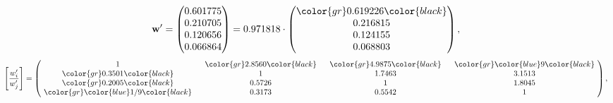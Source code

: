 \begin{example}
\begin{equation*}
\mathbf{w}^{\prime} =
\begin{pmatrix}
0.601775\\
0.210705\\
0.120656\\
0.066864
\end{pmatrix} =
0.971818\cdot
\begin{pmatrix}
\color{gr} 0.619226\color{black} \\
0.216815\\
0.124155\\
0.068803
\end{pmatrix},
\end{equation*}
\begin{equation*}
\left[ \frac{{w}^{\prime}_i}{{w}^{\prime}_j} \right] =
\begin{pmatrix}
$\,\,$ 1 $\,\,$ & $\,\,$\color{gr} 2.8560\color{black} $\,\,$ & $\,\,$\color{gr} 4.9875\color{black} $\,\,$ & $\,\,$\color{gr} \color{blue} 9\color{black} $\,\,$ \\
$\,\,$\color{gr} 0.3501\color{black} $\,\,$ & $\,\,$ 1 $\,\,$ & $\,\,$1.7463$\,\,$ & $\,\,$3.1513  $\,\,$ \\
$\,\,$\color{gr} 0.2005\color{black} $\,\,$ & $\,\,$0.5726$\,\,$ & $\,\,$ 1 $\,\,$ & $\,\,$1.8045 $\,\,$ \\
$\,\,$\color{gr} \color{blue}  1/9\color{black} $\,\,$ & $\,\,$0.3173$\,\,$ & $\,\,$0.5542$\,\,$ & $\,\,$ 1  $\,\,$ \\
\end{pmatrix},
\end{equation*}
\end{example}
\newpage

